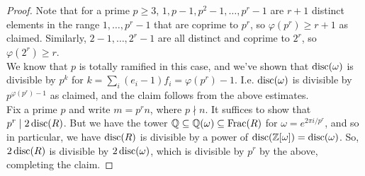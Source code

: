 \begin{proof}
	Note that for a prime $p \geq 3$, $1,p-1,p^2-1,\ldots,p^r-1$ are $r+1$ distinct elements in the range $1,\ldots,p^r-1$ that are coprime to $p^r$, so $\varphi(p^r) \geq r+1$ as claimed. Similarly, $2-1,\ldots,2^r-1$ are all distinct and coprime to $2^r$, so $\varphi(2^r) \geq r$. \\
	
	We know that $p$ is totally ramified in this case, and we've shown that $\operatorname{disc}(\omega)$ is divisible by $p^k$ for $k = \sum_i (e_i-1)f_i = \varphi(p^r)-1$. I.e. $\operatorname{disc}(\omega)$ is divisible by $p^{\varphi(p^r)-1}$ as claimed, and the claim follows from the above estimates. \\
	
	Fix a prime $p$ and write $m = p^rn$, where $p \nmid n$. It suffices to show that $p^r \mid 2\operatorname{disc}(R)$. But we have the tower $\mathbb{Q} \subseteq \mathbb{Q}(\omega) \subseteq \operatorname{Frac}(R)$ for $\omega = e^{2\pi i/p^r}$, and so in particular, we have $\operatorname{disc}(R)$ is divisible by a power of $\operatorname{disc}(\mathbb{Z}[\omega]) = \operatorname{disc}(\omega)$. So, $2\operatorname{disc}(R)$ is divisible by $2\operatorname{disc}(\omega)$, which is divisible by $p^r$ by the above, completing the claim.
\end{proof}
